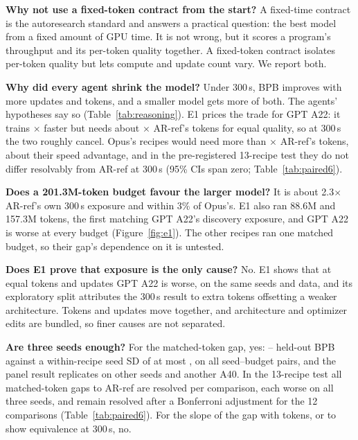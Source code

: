 \documentclass{article}
\begin{document}
\textbf{Why not use a fixed-token contract from the start?} A fixed-time contract is the autoresearch standard and answers a practical question: the best model from a fixed amount of GPU time. It is not wrong, but it scores a program's throughput and its per-token quality together. A fixed-token contract isolates per-token quality but lets compute and update count vary. We report both.

\textbf{Why did every agent shrink the model?} Under 300\,s, BPB improves with more updates and tokens, and a smaller model gets more of both. The agents' hypotheses say so (Table~\ref{tab:reasoning}). E1 prices the trade for GPT A22: it trains \CREOneRho$\times$ faster but needs about \CREOneK$\times$ AR-ref's tokens for equal quality, so at 300\,s the two roughly cancel. Opus's recipes would need more than \CRMTKBound$\times$ AR-ref's tokens, about their speed advantage, and in the pre-registered 13-recipe test they do not differ resolvably from AR-ref at 300\,s (95\% CIs span zero; Table~\ref{tab:paired6}).

\textbf{Does a 201.3M-token budget favour the larger model?} It is about 2.3$\times$ AR-ref's own 300\,s exposure and within 3\% of Opus's. E1 also ran 88.6M and 157.3M tokens, the first matching GPT A22's discovery exposure, and GPT A22 is worse at every budget (Figure~\ref{fig:e1}). The other recipes ran one matched budget, so their gap's dependence on it is untested.

\textbf{Does E1 prove that exposure is the only cause?} No. E1 shows that at equal tokens and updates GPT A22 is worse, on the same seeds and data, and its exploratory split attributes the 300\,s result to extra tokens offsetting a weaker architecture. Tokens and updates move together, and architecture and optimizer edits are bundled, so finer causes are not separated.

\textbf{Are three seeds enough?} For the matched-token gap, yes: \CREOneMatchedLoAbs--\CREOneMatchedHiAbs{} held-out BPB against a within-recipe seed SD of at most \CREOneMaxSD, on all \CREOnePairs{} seed--budget pairs, and the panel result replicates on other seeds and another A40. In the 13-recipe test all \CRSixTokWorseCount{} matched-token gaps to AR-ref are resolved per comparison, each worse on all three seeds, and \CRSixBonfTok{} remain resolved after a Bonferroni adjustment for the 12 comparisons (Table~\ref{tab:paired6}). For the slope of the gap with tokens, or to show equivalence at 300\,s, no.
\end{document}

